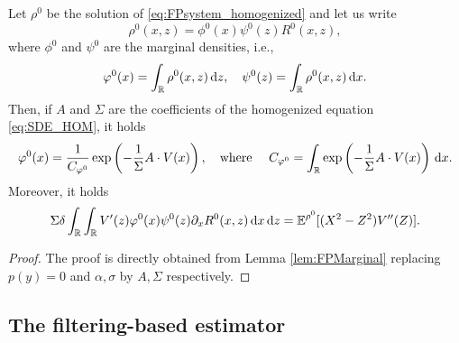 \documentclass[10pt]{article}
\begin{document}
\begin{corollary}\label{lem:FPMarginal_Hom} Let $\rho^0$ be the solution of \eqref{eq:FPsystem_homogenized} and let us write 
	\begin{equation}
		\rho^0(x, z) = \phi^0(x)\psi^0(z)R^0(x,z),
	\end{equation}
	where $\phi^0$ and $\psi^0$ are the marginal densities, i.e., 
	\begin{equation}
		\varphi^0(x) = \int_{\mathbb{R}} \rho^0(x,z) \,\mathrm{d} z, \quad \psi^0(z) = \int_{\mathbb{R}} \rho^0(x,z) \,\mathrm{d} x.
	\end{equation}
	Then, if $A$ and $\Sigma$ are the coefficients of the homogenized equation \eqref{eq:SDE_HOM}, it holds
	\begin{equation}
		\varphi^0(x) = \frac{1}{C_{\varphi^0}} \exp\left(- \frac1{\Sigma} A\cdot V(x)\right), \quad \text{where } \quad C_{\varphi^0} = \int_{\mathbb{R}} \exp\left(- \frac1{\Sigma} A\cdot V(x) \right) \,\mathrm{d} x.
	\end{equation}
	Moreover, it holds
	\begin{equation}
		\Sigma \delta \int_{\mathbb{R}} \int_{\mathbb{R}} V'(z) \varphi^0(x) \psi^0(z) \partial_x R^0(x,z) \,\mathrm{d} x \,\mathrm{d} z = \operatorname{\mathbb{E}}^{\rho^0}[(X^2 - Z^2)V''(Z)].
	\end{equation}
\end{corollary}
\begin{proof} The proof is directly obtained from Lemma \ref{lem:FPMarginal} replacing $p(y)=0$ and $\alpha, \sigma$ by $A, \Sigma$ respectively. 
\end{proof}

\subsection{The filtering-based estimator}\label{sec:FilterMLE}
\end{document}
